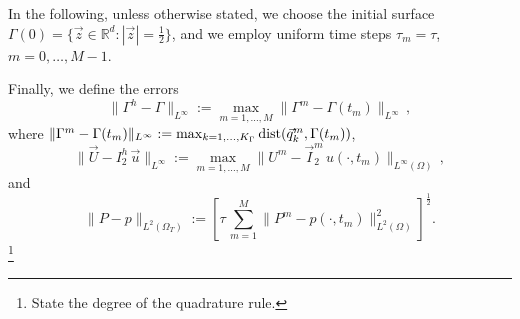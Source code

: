 \documentclass[a4paper,12pt,onecolumn]{article}
\newcommand{\R}{{\mathbb R}}
\newcommand{\errorXx}{\|\Gamma^h - \Gamma\|_{L^\infty}}
\newcommand{\errorUu}[1]{\|\vec U - I^h_{#1}\,\vec u\|_{L^\infty}}
\newcommand{\LerrorPp}{\|P - p\|_{L^2(\Omega_T)}}
\begin{document}
In the following, unless otherwise stated, we choose the initial surface 
$\Gamma(0) = \{ \vec z \in \R^d : |\vec z| = \frac12 \}$, and we employ 
uniform time steps $\tau_m=\tau$, $m=0,\ldots, M-1$.

Finally, we define the errors 
\begin{equation} \label{eq:errorXx}
\errorXx := \max_{m=1,\ldots, M} \|\Gamma^m - \Gamma(t_m)\|_{L^\infty}\,, 
\end{equation}
where $\|\Gamma^m - \Gamma(t_m)\|_{L^\infty} := 
\max_{k=1,\ldots, K_\Gamma} {\rm dist}( \vec{q}^m_k, \Gamma(t_m))$,
\begin{equation*} 
\errorUu2 := \max_{m=1,\ldots, M}\|U^m 
- \vec I^m_2\,u(\cdot,t_m)\|_{L^\infty(\Omega)}\,, 
\end{equation*}
and
\begin{equation*}
\LerrorPp := \left[\tau\,\sum_{m=1}^M \|P^m - p(\cdot,t_m)\|_{L^2(\Omega)}^2 
\right]^\frac12 .
\end{equation*}
\footnote{State the degree of the quadrature rule.}
\end{document}
